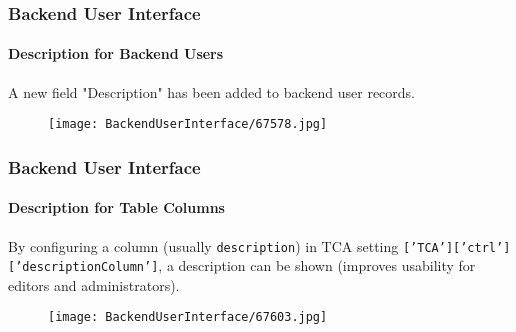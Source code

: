 \begin{frame}[fragile]
	\frametitle{Backend User Interface}
	\framesubtitle{Description for Backend Users}

	A new field "Description" has been added to backend user records.

	\begin{figure}
		\texttt{[image: BackendUserInterface/67578.jpg]}
	\end{figure}

\end{frame}

\begin{frame}[fragile]
	\frametitle{Backend User Interface}
	\framesubtitle{Description for Table Columns}

	By configuring a column (usually \texttt{description}) in TCA setting \texttt{['TCA']['ctrl']['descriptionColumn']},
	a description can be shown (improves usability for editors and administrators).

	\begin{figure}
		\texttt{[image: BackendUserInterface/67603.jpg]}
	\end{figure}

\end{frame}

